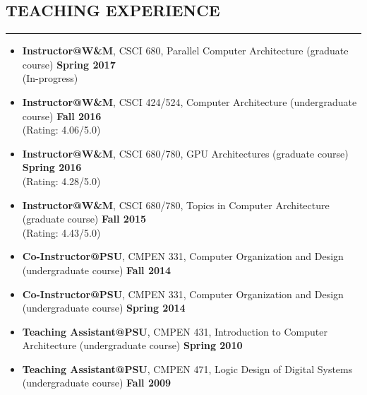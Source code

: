 \documentclass[10pt,a4]{article}
\begin{document}
\subsection*{TEACHING EXPERIENCE}
\hrule
\vspace{0.2cm}
\begin{itemize}
\item{\bf Instructor@W\&M}, CSCI 680, Parallel Computer Architecture (graduate course) \hfill {\bf Spring 2017}  \\ (In-progress)
\item{\bf Instructor@W\&M}, CSCI 424/524, Computer Architecture (undergraduate course) \hfill {\bf Fall 2016}  \\ (Rating: 4.06/5.0)
\item{\bf Instructor@W\&M}, CSCI 680/780, GPU Architectures (graduate course) \hfill {\bf Spring 2016}  \\ (Rating: 4.28/5.0)
\item{\bf Instructor@W\&M}, CSCI 680/780, Topics in Computer Architecture (graduate course) \hfill {\bf Fall 2015} \\ (Rating: 4.43/5.0)
\item{\bf Co-Instructor@PSU}, CMPEN 331, Computer Organization and Design (undergraduate course) \hfill {\bf Fall 2014} 
\item{\bf Co-Instructor@PSU}, CMPEN 331, Computer Organization and Design (undergraduate course)  \hfill {\bf Spring 2014} 
\item{\bf Teaching Assistant@PSU}, CMPEN 431, Introduction to Computer Architecture (undergraduate course)   \hfill {\bf Spring 2010} 
\item{\bf Teaching Assistant@PSU}, CMPEN 471, Logic Design of Digital Systems (undergraduate course)  \hfill {\bf Fall 2009} 
\end{itemize}
\end{document}
